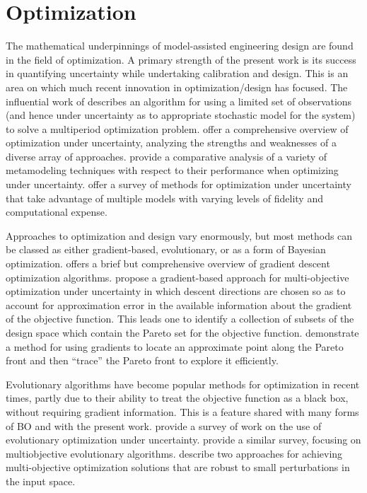\documentclass[12pt]{article}
\begin{document}
\section{Optimization}

The mathematical underpinnings of model-assisted engineering design are found in the field of optimization.
A primary strength of the present work is its success in quantifying uncertainty while undertaking calibration and design.
This is an area on which much recent innovation in optimization/design has focused.
The influential work of \citet{Rockafellar1991} describes an algorithm for using a limited set of observations (and hence under uncertainty as to appropriate stochastic model for the system) to solve a multiperiod optimization problem.
\citet{Sahinidis2004} offer a comprehensive overview of optimization under uncertainty, analyzing the strengths and weaknesses of a diverse array of approaches.
\citet{Jin2003} provide a comparative analysis of a variety of metamodeling techniques with respect to their performance when optimizing under uncertainty.
\citet{Peherstorfer2018} offer a survey of methods for optimization under uncertainty that take advantage of multiple models with varying levels of fidelity and computational expense.

Approaches to optimization and design vary enormously, but most methods can be classed as either gradient-based, evolutionary, or as a form of Bayesian optimization.
\citet{Ruder2016} offers a brief but comprehensive overview of gradient descent optimization algorithms.
\citet{Peitz2018} propose a gradient-based approach for multi-objective optimization under uncertainty in which descent directions are chosen so as to account for approximation error in the available information about the gradient of the objective function.
This leads one to identify a collection of subsets of the design space which contain the Pareto set for the objective function.
\citet{Vasilopoulos2019} demonstrate a method for using gradients to locate an approximate point along the Pareto front and then ``trace'' the Pareto front to explore it efficiently.

Evolutionary algorithms have become popular methods for optimization in recent times, partly due to their ability to treat the objective function as a black box, without requiring gradient information.
This is a feature shared with many forms of BO and with the present work.
\citet{Jin2003} provide a survey of work on the use of evolutionary optimization under uncertainty.
\citet{Zhou2011b} provide a similar survey, focusing on multiobjective evolutionary algorithms.
\citet{Deb2006} describe two approaches for achieving multi-objective optimization solutions that are robust to small perturbations in the input space.
\end{document}

